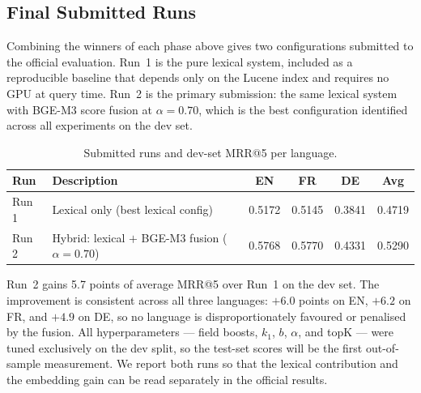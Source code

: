 \subsection{Final Submitted Runs}
\label{subsec:res-final}

Combining the winners of each phase above gives two configurations submitted to the official evaluation. Run~1 is the pure lexical system, included as a reproducible baseline that depends only on the Lucene index and requires no GPU at query time. Run~2 is the primary submission: the same lexical system with BGE-M3 score fusion at $\alpha{=}0.70$, which is the best configuration identified across all experiments on the dev set.

\begin{table}[!ht]
    \caption{Submitted runs and dev-set MRR@5 per language.}
    \label{tab:final-runs}
    \centering
    \begin{tabular}{llcccc}
        \toprule
        Run & Description & EN & FR & DE & Avg \\
        \midrule
        Run 1 & Lexical only (best lexical config)              & 0.5172 & 0.5145 & 0.3841 & 0.4719 \\
        Run 2 & Hybrid: lexical $+$ BGE-M3 fusion ($\alpha{=}0.70$) & 0.5768 & 0.5770 & 0.4331 & 0.5290 \\
        \bottomrule
    \end{tabular}
\end{table}

Run~2 gains 5.7 points of average MRR@5 over Run~1 on the dev set. The improvement is consistent across all three languages: $+6.0$ points on EN, $+6.2$ on FR, and $+4.9$ on DE, so no language is disproportionately favoured or penalised by the fusion. All hyperparameters — field boosts, $k_1$, $b$, $\alpha$, and topK — were tuned exclusively on the dev split, so the test-set scores will be the first out-of-sample measurement. We report both runs so that the lexical contribution and the embedding gain can be read separately in the official results.

